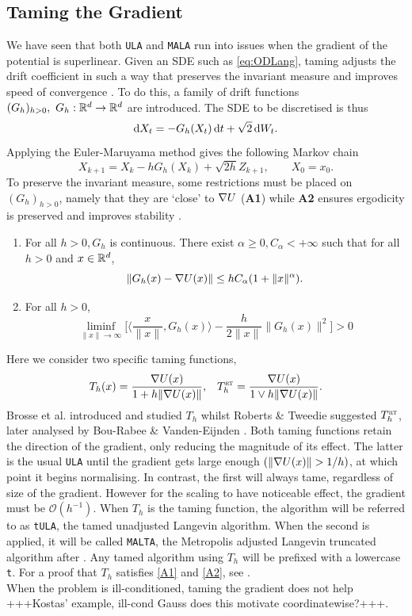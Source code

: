 \subsection{Taming the Gradient}
We have seen that both \texttt{ULA} and \texttt{MALA} run into issues when the gradient of the potential is superlinear. Given an SDE such as \eqref{eq:ODLang}, taming adjusts the drift coefficient in such a way that preserves the invariant measure and improves speed of convergence \cite{Brosse18tULA,RT96,Sabanis13}. To do this, a family of drift functions \((G_h)_{h>0}, \ G_h:\mathbb{R}^d \to \mathbb{R}^d\) are introduced. The SDE to be discretised is thus
	\begin{equation*} \mathop{}\!\mathrm{d} X_t = -G_h(X_t)\mathop{}\!\mathrm{d} t +\sqrt{2}\mathop{}\!\mathrm{d} W_t. \end{equation*}
Applying the Euler-Maruyama method gives the following Markov chain
	\[X_{k+1} =X_k-hG_h(X_k)+\sqrt{2h}Z_{k+1},\qquad  X_0=x_0.\]
To preserve the invariant measure, some restrictions must be placed on \((G_h)_{h>0}\), namely that they are `close' to \(\nabla U\) ({\bf A1}) while {\bf A2} ensures ergodicity is preserved and improves stability \cite{Brosse18tULA}. 

\begin{enumerate}[label={\bf A{\arabic*}}]
	\item  For all \(h>0, G_h\) is continuous. There exist \(\alpha\geq 0, C_{\alpha}<+\infty\) such that for all \(h >0 \) and \(x \in \mathbb{R}^d\),
		\[\|G_h(x)-\nabla U(x)\| \leq hC_{\alpha}(1+\|x\|^{\alpha}).\]\label{A1}
	\item For all \(h>0\),
		\[ \liminf_{\|x\|\to \infty} \bigg\lbrack \bigg\langle \frac{x}{\|x\|}, G_h(x)\bigg\rangle - \frac{h}{2\|x\|}\|G_h(x)\|^2\bigg\rbrack >0\]\label{A2}
\end{enumerate}
Here we consider two specific taming functions,
 \begin{align*}
 T_h(x) = \frac{\nabla U(x)}{1+h\|\nabla U(x)\|}, &&  T^{\text{\sc \tiny RT}}_h = \frac{\nabla U(x)}{1\vee h\|\nabla U(x)\|}.
 \end{align*}
Brosse et al. introduced and studied \(T_h\) whilst Roberts \& Tweedie suggested \(T^{\text{\sc \tiny RT}}_h\), later analysed by Bou-Rabee \& Vanden-Eijnden \cite{BV10MALTA,Brosse18tULA,RT96}. Both taming functions retain the direction of the gradient, only reducing the magnitude of its effect. The latter is the usual \texttt{ULA} until the gradient gets large enough \((\|\grad U(x)\|> 1/h)\), at which point it begins normalising. In contrast, the first will always tame, regardless of size of the gradient. However for the scaling to have noticeable effect, the gradient must be \(\mathcal{O}(h^{-1})\).
When \(T_h\) is the taming function, the algorithm will be referred to as \texttt{tULA}, the tamed unadjusted Langevin algorithm. When the second is applied, it will be called \texttt{MALTA}, the Metropolis adjusted Langevin truncated algorithm after \cite{RT96}. Any tamed algorithm using \(T_h\) will be prefixed with a lowercase \texttt{t}. For a proof that \(T_h\) satisfies \ref{A1} and \ref{A2}, see \cite[Lemma~2]{Brosse18tULA}.
\\
When the problem is ill-conditioned, taming the gradient does not help +++Kostas' example, ill-cond Gauss does this motivate coordinatewise?+++. 
